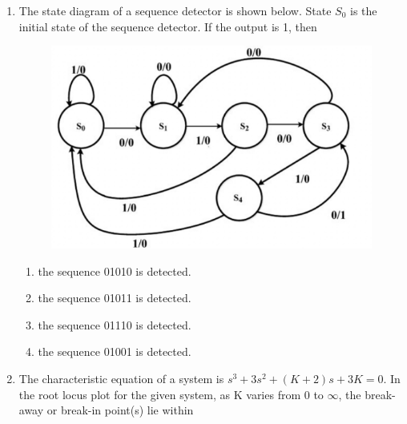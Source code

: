 \documentclass[a4paper, 11pt]{article}
\begin{document}
\begin{enumerate}
    \item The state diagram of a sequence detector is shown below. State $S_0$ is the initial state of the sequence detector. If the output is 1, then
    \begin{figure}[H]
        \centering
        \includegraphics[width=0.8\columnwidth]{figs/Q39.png}
        \caption*{}
        \label{fig:q49}
    \end{figure}
    \begin{enumerate}
        \item the sequence 01010 is detected.
        \item the sequence 01011 is detected.
        \item the sequence 01110 is detected.
        \item the sequence 01001 is detected.
    \end{enumerate}

    \hfill{}

    \item The characteristic equation of a system is $s^3+3s^2+(K+2)s+3K=0$. In the root locus plot for the given system, as K varies from 0 to $\infty$, the break-away or break-in point(s) lie within
    \begin{enumerate}
    \end{enumerate}

    \hfill{}


\end{enumerate}
\end{document}
